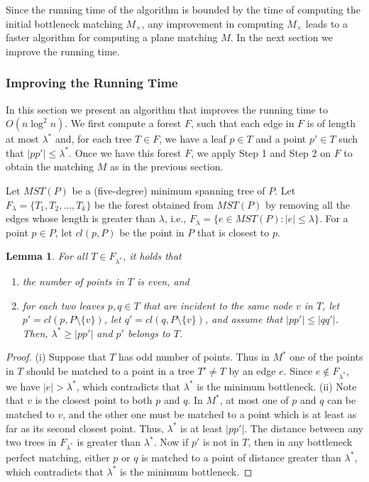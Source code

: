 \documentclass[11pt,a4paper]{article}
\newcommand{\MC}{M_\times}
\newcommand{\btopt}{\lambda^*}
\newtheorem{lemma}{Lemma}
\begin{document}
Since the running time of the algorithm is bounded by the time of computing the initial bottleneck matching $\MC$, any improvement in computing $\MC$ leads to a faster algorithm for computing a plane matching  $M$. In the next section we improve the running time.

\subsubsection{Improving the Running Time}
In this section we present an algorithm that improves the running time to $O(n\log^2 n)$. We first compute a forest $F$, such that each edge in $F$ is of length at most $\btopt$ and, for each tree $T \in F$, we have a leaf $p \in T$ and a point $p' \in T$ such that $|pp'| \le \btopt$. Once we have this forest $F$, we apply Step 1 and Step 2 on $F$ to obtain the matching $M$ as in the previous section. 

Let $MST(P)$ be a (five-degree) minimum spanning tree of $P$. 
Let $F_{\lambda}=\{ T_1, T_2, \dots, T_k\}$ be the forest obtained from $MST(P)$ by removing all the edges whose length is greater than $\lambda$, i.e., $F_{\lambda} = \{e \in MST(P): |e| \le \lambda\}$. For a point $p \in P$, let $cl(p, P)$ be the point in $P$ that is closest to $p$.

\begin{lemma}
\label{opt-forest}
For all $T \in F_{\btopt}$, it holds that
\begin{enumerate}
	\item[(i)]  the number of points in $T$ is even, and
	\item[(ii)]  for each two leaves $p,q \in T$ that are incident to the same node $v$ in $T$, let $p' = cl(p, P\setminus \{v\})$, let $q' = cl(q, P\setminus \{v\})$, and assume that $|pp'| \le |qq'|$. Then, $\btopt \geq |pp'|$ and $p'$ belongs to $T$.
\end{enumerate}
\end{lemma}
\begin{proof}
(i) Suppose that $T$ has odd number of points. Thus in $M^*$ one of the points in $T$ should be matched to a point in a tree $T' \neq T$ by an edge $e$. Since $e \notin F_{\btopt}$, we have $|e|>\btopt$, which contradicts that $\btopt$ is the minimum bottleneck. (ii) Note that $v$ is the closest point to both $p$ and $q$. In $M^*$, at most one of $p$ and $q$ can be matched to $v$, and the other one must be matched to a point which is at least as far as its second closest point. Thus, $\btopt$ is at least $|pp'|$. The distance between any two trees in $F_{\btopt}$ is greater than $\btopt$. Now if $p'$ is not in $T$, then in any bottleneck perfect matching, either $p$ or $q$ is matched to a point of distance greater than $\btopt$, which contradicts that $\btopt$ is the minimum bottleneck.
\end{proof}
\end{document}
